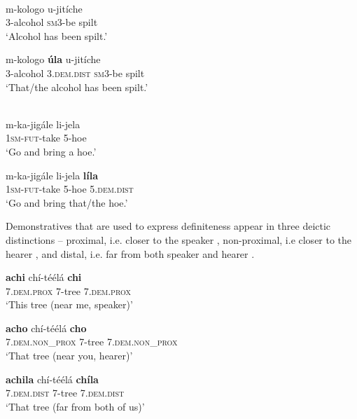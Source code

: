 \documentclass[output=paper,
            colorlinks, citecolor=brown
            ,draftmode
		  ]{langscibook}
\begin{document}
\ea\citet[53]{Taji2020}\\
    \label{ex:taji:34}
    \ea\label{ex:taji:34a} \gll    m-kologo    u-jitíche \\
        3-alcohol    {\textsc{sm3}-be spilt}  \\
        \glt ‘Alcohol has been spilt.’

     \ex\label{ex:taji:34b} \gll  m-kologo    \textbf{úla}                    u-jitíche \\
        3-alcohol    3.\textsc{dem.dist}   {\textsc{sm3}-be spilt}\\
      \glt ‘That/the alcohol has been spilt.’   
      \z

 \ex \citet[53]{Taji2020}\\\label{ex:taji:35}  
    \ea\label{ex:taji:35a} \gll  m-ka-jigále        li-jela \\
          \textsc{1sm-fut}-take  5-hoe  \\
          \glt ‘Go and bring a hoe.’ 

    \ex\label{ex:taji:35b} \gll  m-ka-jigále     li-jela    \textbf{líla}  \\
          \textsc{1sm-fut}-take  5-hoe    5.\textsc{dem.dist}\\           
          \glt ‘Go and bring that/the hoe.’      
    \z
\z

Demonstratives that are used to express definiteness appear in three deictic distinctions – proximal, i.e. closer to the speaker , non-proximal, i.e closer to the hearer , and distal, i.e. far from both speaker and hearer .

\ea%
    \label{ex:taji:36}
    \gll \textbf{achi}                        chí-téélá      \textbf{chi}\\
    7.\textsc{dem.prox}      7-tree          7.\textsc{dem.prox}\\
    \glt ‘This tree (near me, speaker)’

\ex%
    \label{ex:taji:37}
    \gll \textbf{acho}                                  chí-téélá      \textbf{cho}\\
    7.\textsc{dem.non\_prox}      7-tree          7.\textsc{dem.non\_prox}\\         
  \glt ‘That tree (near you, hearer)’

\ex%
    \label{ex:taji:38}
    \gll \textbf{achila}                    chí-téélá      \textbf{chíla}\\
    7.\textsc{dem.dist}      7-tree          7.\textsc{dem.dist}\\
  \glt ‘That tree (far from both of us)’
\z
\end{document}
